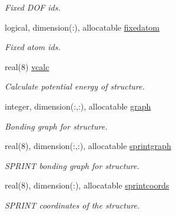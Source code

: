 \begin{DoxyCompactItemize}
\begin{DoxyCompactList}\small\item\em Fixed D\+OF ids. \end{DoxyCompactList}\item 
\mbox{\label{structchemstr_1_1cxs_a38b8cccf3115fb847a43874d1244fc59}} 
logical, dimension(\+:), allocatable \mbox{\hyperlink{structchemstr_1_1cxs_a38b8cccf3115fb847a43874d1244fc59}{fixedatom}}
\begin{DoxyCompactList}\small\item\em Fixed atom ids. \end{DoxyCompactList}\item 
\mbox{\label{structchemstr_1_1cxs_ae5a37234bb7581279a4e20c3c0cd7a91}} 
real(8) \mbox{\hyperlink{structchemstr_1_1cxs_ae5a37234bb7581279a4e20c3c0cd7a91}{vcalc}}
\begin{DoxyCompactList}\small\item\em Calculate potential energy of structure. \end{DoxyCompactList}\item 
\mbox{\label{structchemstr_1_1cxs_af060de22157392ae373bb38eec3e0042}} 
integer, dimension(\+:,\+:), allocatable \mbox{\hyperlink{structchemstr_1_1cxs_af060de22157392ae373bb38eec3e0042}{graph}}
\begin{DoxyCompactList}\small\item\em Bonding graph for structure. \end{DoxyCompactList}\item 
\mbox{\label{structchemstr_1_1cxs_aeaa654119810cc8f260e6a94d337108c}} 
real(8), dimension(\+:,\+:), allocatable \mbox{\hyperlink{structchemstr_1_1cxs_aeaa654119810cc8f260e6a94d337108c}{sprintgraph}}
\begin{DoxyCompactList}\small\item\em S\+P\+R\+I\+NT bonding graph for structure. \end{DoxyCompactList}\item 
\mbox{\label{structchemstr_1_1cxs_af061b63d55169aec15bee1023b6f8ad4}} 
real(8), dimension(\+:), allocatable \mbox{\hyperlink{structchemstr_1_1cxs_af061b63d55169aec15bee1023b6f8ad4}{sprintcoords}}
\begin{DoxyCompactList}\small\item\em S\+P\+R\+I\+NT coordinates of the structure. \end{DoxyCompactList}\item 

\end{DoxyCompactItemize}
